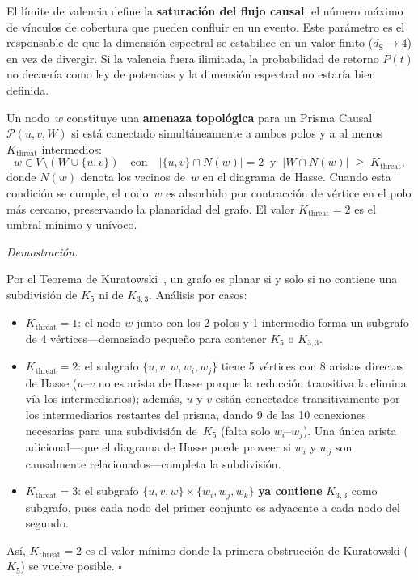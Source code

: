 \documentclass[11pt, a4paper, openany]{book}
\newcommand{\dS}{d_{\mathrm{S}}}
\renewenvironment{proof}[1][Demostraci\'on]{%
  \par\noindent\textit{#1.}\quad
}{\hfill$\square$\par\medskip}
\begin{document}
\noindent
El l\'imite de valencia define la \textbf{saturaci\'on del flujo
causal}: el n\'umero m\'aximo de v\'inculos de cobertura que pueden
confluir en un evento. Este par\'ametro es el responsable de que la
dimensi\'on espectral se estabilice en un valor finito ($\dS \to 4$)
en vez de divergir. Si la valencia fuera ilimitada, la probabilidad
de retorno $P(t)$ no decaer\'ia como ley de potencias y la
dimensi\'on espectral no estar\'ia bien definida.

\begin{theorem}[Umbral de Kuratowski $K_{\text{threat}} = 2$]
\label{thm:kuratowski-threshold}
Un nodo~$w$ constituye una \textbf{amenaza topol\'ogica} para un
Prisma Causal $\mathcal{P}(u, v, W)$ si est\'a conectado
simult\'aneamente a ambos polos y a al menos $K_{\text{threat}}$
intermedios:
\begin{equation}
  w \in V \setminus (W \cup \{u,v\})
  \quad\text{con}\quad
  |\{u, v\} \cap N(w)| = 2
  \;\;\text{y}\;\;
  |W \cap N(w)| \;\geq\; K_{\text{threat}},
  \label{eq:kuratowski-threshold}
\end{equation}
donde $N(w)$ denota los vecinos de~$w$ en el diagrama de Hasse. Cuando
esta condici\'on se cumple, el nodo~$w$ es absorbido por contracci\'on
de v\'ertice en el polo m\'as cercano, preservando la planaridad del
grafo. El valor $K_{\text{threat}} = 2$ es el umbral m\'inimo y
un\'ivoco.
\end{theorem}

\begin{proof}
Por el Teorema de Kuratowski~\cite{kuratowski1930,diestel2017}, un
grafo es planar si y solo si no contiene una subdivisi\'on de $K_5$ ni de
$K_{3,3}$. An\'alisis por casos:
\begin{itemize}
  \item $K_{\text{threat}} = 1$: el nodo $w$ junto con los 2 polos y
    1 intermedio forma un subgrafo de 4 v\'ertices---demasiado peque\~no
    para contener $K_5$ o $K_{3,3}$.
  \item $K_{\text{threat}} = 2$: el subgrafo
    $\{u, v, w, w_i, w_j\}$ tiene 5 v\'ertices con 8 aristas directas
    de Hasse ($u$--$v$ no es arista de Hasse porque la reducci\'on
    transitiva la elimina v\'ia los intermediarios); adem\'as, $u$ y $v$
    est\'an conectados transitivamente por los intermediarios restantes
    del prisma, dando 9 de las 10 conexiones necesarias para una
    subdivisi\'on de~$K_5$ (falta solo $w_i$--$w_j$). Una \'unica arista
    adicional---que el diagrama de Hasse puede proveer si $w_i$ y
    $w_j$ son causalmente relacionados---completa la subdivisi\'on.
  \item $K_{\text{threat}} = 3$: el subgrafo
    $\{u, v, w\} \times \{w_i, w_j, w_k\}$ \textbf{ya contiene}
    $K_{3,3}$ como subgrafo, pues cada nodo del primer conjunto es
    adyacente a cada nodo del segundo.
\end{itemize}
As\'i, $K_{\text{threat}} = 2$ es el valor m\'inimo donde la primera
obstrucci\'on de Kuratowski ($K_5$) se vuelve posible.
\end{proof}
\end{document}
